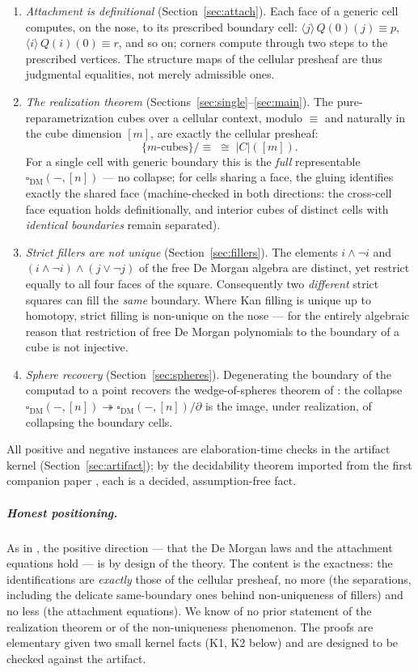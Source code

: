 \documentclass[11pt]{amsart}
\theoremstyle{definition}
\newcommand{\Dbox}{\square_{\mathrm{DM}}}
\newcommand{\aconv}{\equiv}
\newcommand{\Real}[1]{|#1|}
\begin{document}
\begin{enumerate}
\item \emph{Attachment is definitional}
  (Section~\ref{sec:attach}).  Each face of a generic cell computes,
  on the nose, to its prescribed boundary cell:
  $\langle j \rangle\, Q(0)(j) \aconv p$, \
  $\langle i \rangle\, Q(i)(0) \aconv r$, and so on; corners
  compute through two steps to the prescribed vertices.  The
  structure maps of the cellular presheaf are thus judgmental
  equalities, not merely admissible ones.
\item \emph{The realization theorem}
  (Sections~\ref{sec:single}--\ref{sec:main}).  The
  pure-reparametrization cubes over a cellular context, modulo
  $\aconv$ and naturally in the cube dimension $[m]$, are exactly
  the cellular presheaf:
  \[
    \{\text{$m$-cubes}\}/{\aconv} \;\cong\; \Real{C}([m]).
  \]
  For a single cell with generic boundary this is the \emph{full}
  representable $\Dbox(-,[n])$ --- no collapse; for cells sharing a
  face, the gluing identifies exactly the shared face
  (machine-checked in both directions: the cross-cell face equation
  holds definitionally, and interior cubes of distinct cells with
  \emph{identical boundaries} remain separated).
\item \emph{Strict fillers are not unique}
  (Section~\ref{sec:fillers}).  The elements
  $i \wedge \neg i$ and $(i \wedge \neg i) \wedge (j \vee \neg j)$
  of the free De Morgan algebra are distinct, yet restrict equally
  to all four faces of the square.  Consequently two
  \emph{different} strict squares can fill the \emph{same} boundary.
  Where Kan filling is unique up to homotopy, strict filling is
  non-unique on the nose --- for the entirely algebraic reason that
  restriction of free De Morgan polynomials to the boundary of a
  cube is not injective.
\item \emph{Sphere recovery} (Section~\ref{sec:spheres}).
  Degenerating the boundary of the computad to a point recovers the
  wedge-of-spheres theorem of \cite{Sphere}: the collapse
  $\Dbox(-,[n]) \twoheadrightarrow \Dbox(-,[n])/\partial$ is the
  image, under realization, of collapsing the boundary cells.
\end{enumerate}

All positive and negative instances are elaboration-time checks in
the artifact kernel (Section~\ref{sec:artifact}); by the
decidability theorem imported from the first companion paper
\cite{Const}, each is a decided, assumption-free fact.

\subparagraph*{Honest positioning.}  As in \cite{Sphere}, the
positive direction --- that the De Morgan laws and the attachment
equations hold --- is by design of the theory.  The content is the
exactness: the identifications are \emph{exactly} those of the
cellular presheaf, no more (the separations, including the delicate
same-boundary ones behind non-uniqueness of fillers) and no less
(the attachment equations).  We know of no prior statement of the
realization theorem or of the non-uniqueness phenomenon.  The
proofs are elementary given two small kernel facts (K1, K2 below)
and are designed to be checked against the artifact.
\end{document}
